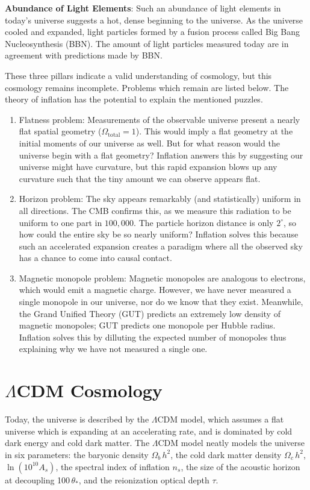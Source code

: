 \noindent
\textbf{Abundance of Light Elements}:  Such an abundance of light elements in today's universe suggests a hot, dense beginning to the universe.  As the universe cooled and expanded, light particles formed by a fusion process called Big Bang Nucleosynthesis (BBN).  The amount of light particles measured today are in agreement with predictions made by BBN.

These three pillars indicate a valid understanding of cosmology, but this cosmology remains incomplete.  Problems which remain are listed below.
The theory of inflation has the potential to explain the mentioned puzzles.

\begin{enumerate}
    \item Flatness problem:  Measurements of the observable universe present a nearly flat spatial geometry ($\Omega_{\text{total}}=1$).  This would imply a flat geometry at the initial moments of our universe as well.  But for what reason would the universe begin with a flat geometry?  Inflation answers this by suggesting our universe might have curvature, but this rapid expansion blows up any curvature such that the tiny amount we can observe appears flat. 
    \item Horizon problem:  The sky appears remarkably (and statistically) uniform in all directions.  The CMB confirms this, as we measure this radiation to be uniform to one part in $100,000$.  The particle horizon distance is only $2^{\circ}$, so how could the entire sky be so nearly uniform?  Inflation solves this because such an accelerated expansion creates a paradigm where all the observed sky has a chance to come into causal contact.
    \item Magnetic monopole problem:  Magnetic monopoles are analogous to electrons, which would emit a magnetic charge.  However, we have never measured a single monopole in our universe, nor do we know that they exist.  Meanwhile, the Grand Unified Theory (GUT) predicts an extremely low density of magnetic monopoles; GUT predicts one monopole per Hubble radius.  Inflation solves this by dilluting the expected number of monopoles thus explaining why we have not measured a single one.
\end{enumerate}
\section{$\Lambda$CDM Cosmology}
Today, the universe is described by the $\Lambda$CDM model, which assumes a flat universe which is expanding at an accelerating rate, and is dominated by cold dark energy and cold dark matter.  The $\Lambda$CDM model neatly models the universe in six parameters: the baryonic density $\Omega_b\,h^2$, the cold dark matter density $\Omega_c\,h^2$, $\ln(10^{10}A_s)$, the spectral index of inflation $n_s$, the size of the acoustic horizon at decoupling 100\,$\theta_{*}$, and the reionization optical depth $\tau$. 

